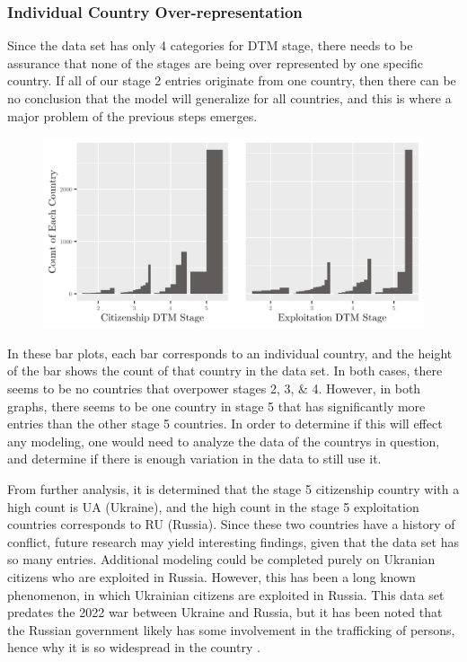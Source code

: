 \documentclass{article} %
\begin{document}
\subsubsection{Individual Country Over-representation}\label{Overrep}

Since the data set has only 4 categories for DTM stage, there needs to be assurance that none of the stages are being over represented by one specific country. If all of our stage 2 entries originate from one country, then there can be no conclusion that the model will generalize for all countries, and this is where a major problem of the previous steps emerges.

\FloatBarrier
\begin{figure}[H]
	\includegraphics[width = \textwidth]{CountryCountBarplot}
\end{figure}
\FloatBarrier

In these bar plots, each bar corresponds to an individual country, and the height of the bar shows the count of that country in the data set. In both cases, there seems to be no countries that overpower stages 2, 3, \& 4. However, in both graphs, there seems to be one country in stage 5 that has significantly more entries than the other stage 5 countries. In order to determine if this will effect any modeling, one would need to analyze the data of the countrys in question, and determine if there is enough variation in the data to still use it. 

From further analysis, it is determined that the stage 5 citizenship country with a high count is UA (Ukraine), and the high count in the stage 5 exploitation countries corresponds to RU (Russia). Since these two countries have a history of conflict, future research may yield interesting findings, given that the data set has so many entries. Additional modeling could be completed purely on Ukranian citizens who are exploited in Russia. However, this has been a long known phenomenon, in which Ukrainian citizens are exploited in Russia. This data set predates the 2022 war between Ukraine and Russia, but it has been noted that the Russian government likely has some involvement in the trafficking of persons, hence why it is so widespread in the country \parencite{RussiaTrafficking}.
\end{document}
